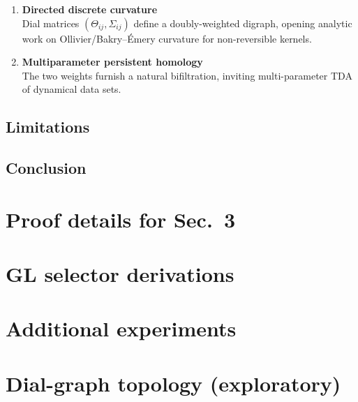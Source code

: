 \documentclass{article}
\theoremstyle{plain}
\theoremstyle{definition}
\theoremstyle{remark}
\begin{document}
		\begin{enumerate}[label=\textbf{(F\arabic*)},leftmargin=*]
 			
			 \item \textbf{Directed discrete curvature}\\
        				Dial matrices $(\Theta_{ij},\Sigma_{ij})$ define a doubly-weighted digraph, opening analytic work on Ollivier/Bakry–Émery curvature for non-reversible kernels.
				
			\item \textbf{Multiparameter persistent homology}\\
				The two weights furnish a natural bifiltration, inviting multi-parameter TDA of dynamical data sets.
		\end{enumerate}

	\subsection{Limitations}

	\subsection{Conclusion}

\appendix
\section{Proof details for Sec.~3}
\section{GL selector derivations}
\section{Additional experiments}
\section{Dial-graph topology (exploratory)}
\end{document}
